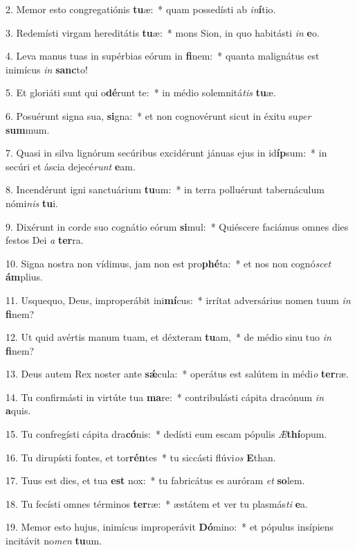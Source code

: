2. Memor esto congregatiónis \textbf{tu}æ:~*  quam possedísti ab \textit{in}\textbf{í}tio.\

3. Redemísti virgam hereditátis \textbf{tu}æ:~*  mons Sion, in quo habitásti \textit{in} \textbf{e}o.\

4. Leva manus tuas in supérbias eórum in \textbf{fi}nem:~*  quanta malignátus est inimícus \textit{in} \textbf{sanc}to!\

5. Et gloriáti sunt qui o\textbf{dé}runt te:~*  in médio solemnitá\textit{tis} \textbf{tu}æ.\

6. Posuérunt signa sua, \textbf{si}gna:~*  et non cognovérunt sicut in éxitu su\textit{per} \textbf{sum}mum.\

7. Quasi in silva lignórum secúribus excidérunt jánuas ejus in id\textbf{íp}sum:~*  in secúri et áscia dejecé\textit{runt} \textbf{e}am.\

8. Incendérunt igni sanctuárium \textbf{tu}um:~*  in terra polluérunt tabernáculum nómi\textit{nis} \textbf{tu}i.\

9. Dixérunt in corde suo cognátio eórum \textbf{si}mul:~*  Quiéscere faciámus omnes dies festos Dei \textit{a} \textbf{ter}ra.\

10. Signa nostra non vídimus, jam non est pro\textbf{phé}ta:~*  et nos non cognó\textit{scet} \textbf{ám}plius.\

11. Usquequo, Deus, improperábit ini\textbf{mí}cus:~*  irrítat adversárius nomen tuum \textit{in} \textbf{fi}nem?\

12. Ut quid avértis manum tuam, et déxteram \textbf{tu}am,~*  de médio sinu tuo \textit{in} \textbf{fi}nem?\

13. Deus autem Rex noster ante \textbf{sǽ}cula:~*  operátus est salútem in médi\textit{o} \textbf{ter}ræ.\

14. Tu confirmásti in virtúte tua \textbf{ma}re:~*  contribulásti cápita dracónum \textit{in} \textbf{a}quis.\

15. Tu confregísti cápita dra\textbf{có}nis:~*  dedísti eum escam pópulis \textit{Æ}\textbf{thí}opum.\

16. Tu dirupísti fontes, et tor\textbf{rén}tes~*  tu siccásti flúvi\textit{os} \textbf{E}than.\

17. Tuus est dies, et tua \textbf{est} nox:~*  tu fabricátus es auróram \textit{et} \textbf{so}lem.\

18. Tu fecísti omnes términos \textbf{ter}ræ:~*  æstátem et ver tu plasmás\textit{ti} \textbf{e}a.\

19. Memor esto hujus, inimícus improperávit \textbf{Dó}mino:~*  et pópulus insípiens incitávit no\textit{men} \textbf{tu}um.\

